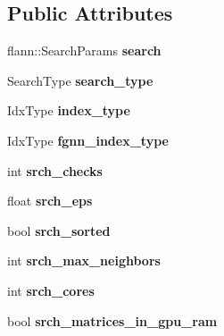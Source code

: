\subsection*{Public Attributes}
\begin{DoxyCompactItemize}
\item 
\hypertarget{structFLANNParams_af4e34a5afc91c4695deda58823026890}{flann\-::\-Search\-Params {\bfseries search}}\label{structFLANNParams_af4e34a5afc91c4695deda58823026890}

\item 
\hypertarget{structFLANNParams_ac995a5579a9339682b95931d07fe1eb3}{Search\-Type {\bfseries search\-\_\-type}}\label{structFLANNParams_ac995a5579a9339682b95931d07fe1eb3}

\item 
\hypertarget{structFLANNParams_a99d2e4f15748be233f826958efc87487}{Idx\-Type {\bfseries index\-\_\-type}}\label{structFLANNParams_a99d2e4f15748be233f826958efc87487}

\item 
\hypertarget{structFLANNParams_af8b842b0f8e79ba8d5e34e757b42e6f6}{Idx\-Type {\bfseries fgnn\-\_\-index\-\_\-type}}\label{structFLANNParams_af8b842b0f8e79ba8d5e34e757b42e6f6}

\item 
\hypertarget{structFLANNParams_abcecd1f8b7b38fc91ddc7e0294e423cc}{int {\bfseries srch\-\_\-checks}}\label{structFLANNParams_abcecd1f8b7b38fc91ddc7e0294e423cc}

\item 
\hypertarget{structFLANNParams_aaec471ccff2175ec845d7149cbd81643}{float {\bfseries srch\-\_\-eps}}\label{structFLANNParams_aaec471ccff2175ec845d7149cbd81643}

\item 
\hypertarget{structFLANNParams_ad3eb87a9202039f51b5926c439c9a1e4}{bool {\bfseries srch\-\_\-sorted}}\label{structFLANNParams_ad3eb87a9202039f51b5926c439c9a1e4}

\item 
\hypertarget{structFLANNParams_a034054a451d3adc4b65a7a202b226d0e}{int {\bfseries srch\-\_\-max\-\_\-neighbors}}\label{structFLANNParams_a034054a451d3adc4b65a7a202b226d0e}

\item 
\hypertarget{structFLANNParams_af10644d1f55fb0263aed63e21982cdb0}{int {\bfseries srch\-\_\-cores}}\label{structFLANNParams_af10644d1f55fb0263aed63e21982cdb0}

\item 
\hypertarget{structFLANNParams_a0a530e7c76e3debaa70dea32474447fc}{bool {\bfseries srch\-\_\-matrices\-\_\-in\-\_\-gpu\-\_\-ram}}\label{structFLANNParams_a0a530e7c76e3debaa70dea32474447fc}


\end{DoxyCompactItemize}
